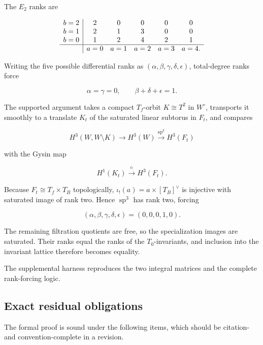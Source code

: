 \documentclass[
  10pt,
  letterpaper,
]{article}
\begin{document}
The \(E_2\) ranks are

\[
\begin{array}{c|ccccc}
b=2&2&0&0&0&0\\
b=1&2&1&3&0&0\\
b=0&1&2&4&2&1\\ \hline
&a=0&a=1&a=2&a=3&a=4.
\end{array}
\]

Writing the five possible differential ranks as
\((\alpha,\beta,\gamma,\delta,\epsilon)\), total-degree ranks force

\[
\alpha=\gamma=0,
\qquad
\beta+\delta+\epsilon=1.
\]

The supported argument takes a compact \(T_f\)-orbit \(K\cong T^2\) in
\(W^\circ\), transports it smoothly to a translate \(K_t\) of the
saturated linear subtorus in \(F_t\), and compares

\[
H^3(W,W\setminus K)\to H^3(W)\xrightarrow{\operatorname{sp}^3}H^3(F_t)
\]

with the Gysin map

\[
H^1(K_t)\xrightarrow{\iota_!}H^3(F_t).
\]

Because \(F_t\cong T_f\times T_B\) topologically,
\(\iota_!(a)=a\times[T_B]^\vee\) is injective with saturated image of
rank two. Hence \(\operatorname{sp}^3\) has rank two, forcing

\[
(\alpha,\beta,\gamma,\delta,\epsilon)=(0,0,0,1,0).
\]

The remaining filtration quotients are free, so the specialization
images are saturated. Their ranks equal the ranks of the
\(T_0\)-invariants, and inclusion into the invariant lattice therefore
becomes equality.

The supplemental harness reproduces the two integral matrices and the
complete rank-forcing logic.

\subsection{Exact residual
obligations}\label{exact-residual-obligations}

The formal proof is sound under the following items, which should be
citation- and convention-complete in a revision.
\end{document}
